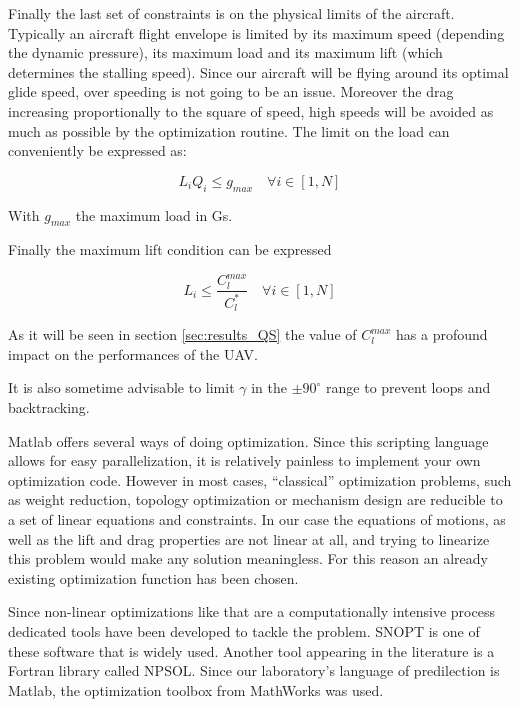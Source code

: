 \par Finally the last set of constraints is on the physical limits of the aircraft.
Typically an aircraft flight envelope is limited by its maximum speed (depending the dynamic pressure), its maximum load and its maximum lift (which determines the stalling speed).
Since our aircraft will be flying around its optimal glide speed, over speeding is not going to be an issue.
Moreover the drag increasing proportionally to the square of speed, high speeds will be avoided as much as possible by the optimization routine.
The limit on the load can conveniently be expressed as:

\begin{equation}
  L_i Q_i \leq g_{max} \quad \forall i \in [1,N]
  \label{eqn:load_constraint}
\end{equation}

With $g_{max}$ the maximum load in Gs.


\par Finally the maximum lift condition can be expressed

\begin{equation}
  L_i \le \frac{C_l^{max}}{C_l^*} \quad \forall i \in [1,N]
  \label{eqn:lift_constraint}
\end{equation}

As it will be seen in section \ref{sec:results_QS} the value of $C_l^{max}$ has a profound impact on the performances of the UAV.

\par It is also sometime advisable to limit $\gamma$ in the $\pm 90^{\circ}$ range to prevent loops and backtracking.


Matlab offers several ways of doing optimization.
Since this scripting language allows for easy parallelization, it is relatively painless to implement your own optimization code.
However in most cases, ``classical'' optimization problems, such as weight reduction, topology optimization or mechanism design are reducible to a set of linear equations and constraints.
In our case the equations of motions, as well as the lift and drag properties are not linear at all, and trying to linearize this problem would make any solution meaningless.
For this reason an already existing optimization function has been chosen.

\par Since non-linear optimizations like that are a computationally intensive process dedicated tools have been developed to tackle the problem.
SNOPT \cite{SNOPT} is one of these software that is widely used.
Another tool appearing in the literature is a Fortran library called NPSOL.
Since our laboratory's language of predilection is Matlab, the optimization toolbox from MathWorks was used.

